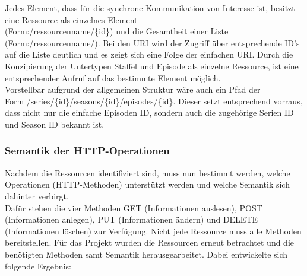 \documentclass[a4paper]{article}
\begin{document}
Jedes Element, dass für die synchrone Kommunikation von Interesse ist, besitzt eine Ressource als einzelnes Element\\ 
(Form:/ressourcenname/\{id\}) und die Gesamtheit einer Liste (Form:/ressourcenname/). Bei den URI wird der Zugriff über entsprechende ID's auf die Liste deutlich und es zeigt sich eine Folge der einfachen URI. Durch die Konzipierung der Untertypen Staffel und Episode als einzelne Ressource, ist eine entsprechender Aufruf auf das bestimmte Element möglich.\\
Vorstellbar aufgrund der allgemeinen Struktur wäre auch ein Pfad der \\
Form /series/\{id\}/seasons/\{id\}/episodes/\{id\}.  Dieser setzt entsprechend vorraus, dass nicht nur die einfache Episoden ID, sondern auch die zugehörige Serien ID und Season ID bekannt ist.

\subsubsection{Semantik der HTTP-Operationen}

Nachdem die Ressourcen identifiziert sind, muss nun bestimmt werden, welche Operationen (HTTP-Methoden) unterstützt werden und welche Semantik sich dahinter verbirgt.\\
Dafür stehen die vier Methoden GET (Informationen auslesen), POST (Informationen anlegen), PUT (Informationen ändern) und DELETE (Informationen löschen) zur Verfügung. Nicht jede Ressource muss alle Methoden bereitstellen. Für das Projekt wurden die Ressourcen erneut betrachtet und die benötigten Methoden samt Semantik herausgearbeitet. Dabei entwickelte sich folgende Ergebnis:
\end{document}
